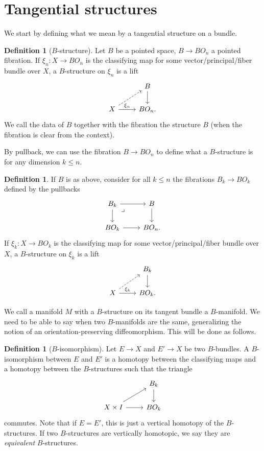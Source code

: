 \documentclass{amsart}
\theoremstyle{definition}
\newtheorem{defi}[thm]{Definition}
\theoremstyle{remark}
\begin{document}
\section{Tangential structures}
We start by defining what we mean by a tangential structure on a bundle.

\begin{defi}[$B$-structure]
    Let $B$ be a pointed space, $B\to BO_n$ a pointed fibration. If $\xi_n:X\to BO_n$ is the classifying map for some vector/principal/fiber bundle over $X$, a $B$-structure on $\xi_n$ is a lift
    \[\begin{tikzcd}
                                      & B \arrow[d] \\
X \arrow[ru, dashed] \arrow[r, "\xi_n"] & BO_n       .
\end{tikzcd}\]
We call the data of $B$ together with the fibration the structure $B$ (when the fibration is clear from the context).
\end{defi}
By pullback, we can use the fibration $B\to BO_n$ to define what a $B$-structure is for any dimension $k\leq n$.
\begin{defi}
    If $B$ is as above, consider for all $k\leq n$ the fibrations $B_k\to BO_k$ defined by the pullbacks
    \[\begin{tikzcd}
B_k \arrow[r] \arrow[d] \arrow[dr, phantom, "\lrcorner", very near start] & B \arrow[d] \\
BO_k \arrow[r]          & BO_n    .   
\end{tikzcd}\]
If $\xi_k:X\to BO_k$ is the classifying map for some vector/principal/fiber bundle over $X$, a $B$-structure on $\xi_k$ is a lift
    \[\begin{tikzcd}
                                      & B_k \arrow[d] \\
X \arrow[ru, dashed] \arrow[r, "\xi_k"] & BO_k   .    
\end{tikzcd}\]
\end{defi}

We call a manifold $M$ with a $B$-structure on its tangent bundle a $B$-manifold. We need to be able to say when two $B$-manifolds are the same, generalizing the notion of an orientation-preserving diffeomorphism. This will be done as follows.

\begin{defi}[$B$-isomorphism]
    Let $E\to X$ and $E'\to X$ be two $B$-bundles. A $B$-isomorphism between $E$ and $E'$ is a homotopy between the classifying maps and a homotopy between the $B$-structures such that the triangle
    \[\begin{tikzcd}
                               & B_k \arrow[d] \\
X\times I \arrow[ru] \arrow[r] & BO_k         
\end{tikzcd}\]
    commutes. Note that if $E=E'$, this is just a vertical homotopy of the $B$-structures. If two $B$-structures are vertically homotopic, we say they are \textit{equivalent} $B$-structures.
\end{defi}
\end{document}
